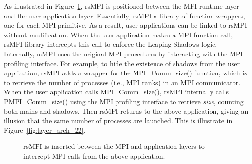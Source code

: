 As illustrated in Figure~\ref{fig:layer_arch}, rsMPI is positioned between the MPI runtime layer and the user application layer. Essentially, rsMPI a library of function wrappers, one for each MPI primitive. As a result, user applications can be linked to rsMPI without modification. When the user application makes a MPI function call, rsMPI library intercepts this call to enforce the Leaping Shadows logic. Internally, rsMPI uses the original MPI procedures by interacting with the MPI profiling interface. For example, to hide the existence of shadows from the user application, rsMPI adds a wrapper for the MPI\_Comm\_size() function, which is to retrieve the number of processes (i.e., MPI ranks) in an MPI communicator. When the user application calls MPI\_Comm\_size(), rsMPI internally calls PMPI\_Comm\_size() using the MPI profiling interface to retrieve \textit{size}, counting both mains and shadows. Then rsMPI returns  to the above application, giving an illusion that the same number of processes are launched. This is illustrate in Figure~\ref{fig:layer_arch_22}.


\begin{figure}[!h]
  \begin{center}
  \end{center}
  \caption{rsMPI is inserted between the MPI and application layers to intercept MPI calls from the above application.}
  \label{fig:layer_arch}
\end{figure}

